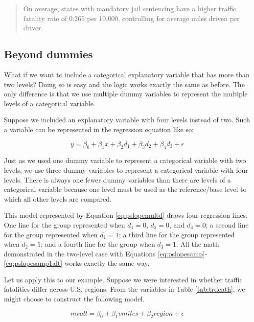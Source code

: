 \documentclass[
]{book}
\begin{document}
\begin{quote}
On average, states with mandatory jail sentencing have a higher traffic fatality rate of 0.265 per 10,000, controlling for average miles driven per driver.
\end{quote}

\hypertarget{beyond-dummies}{%
\subsection{Beyond dummies}\label{beyond-dummies}}

What if we want to include a categorical explanatory variable that has more than two levels? Doing so is easy and the logic works exactly the same as before. The only difference is that we use multiple dummy variables to represent the multiple levels of a categorical variable.

Suppose we included an explanatory variable with four levels instead of two. Such a variable can be represented in the regression equation like so:

\begin{equation}
y = \beta_0 + \beta_1x + \beta_2d_1 + \beta_3d_2 + \beta_4d_3 + \epsilon
\label{eq:pslopemultd}
\end{equation}

Just as we used one dummy variable to represent a categorical variable with two levels, we use three dummy variables to represent a categorical variable with four levels. There is always one fewer dummy variables than there are levels of a categorical variable because one level must be used as the reference/base level to which all other levels are compared.

This model represented by Equation \eqref{eq:pslopemultd} draws four regression lines. One line for the group represented when \(d_1=0\), \(d_2=0\), and \(d_3=0\); a second line for the group represented when \(d_1=1\); a third line for the group represented when \(d_2=1\); and a fourth line for the group when \(d_3=1\). All the math demonstrated in the two-level case with Equations \eqref{eq:pslopesamp}-\eqref{eq:pslopesamp1alt} works exactly the same way.

Let us apply this to our example. Suppose we were interested in whether traffic fatalities differ across U.S. regions. From the variables in Table \ref{tab:trdeath}, we might choose to construct the following model.

\begin{equation}
mrall = \beta_0 + \beta_1vmiles + \beta_2region + \epsilon
\label{eq:pslopeexamp2}
\end{equation}
\end{document}
